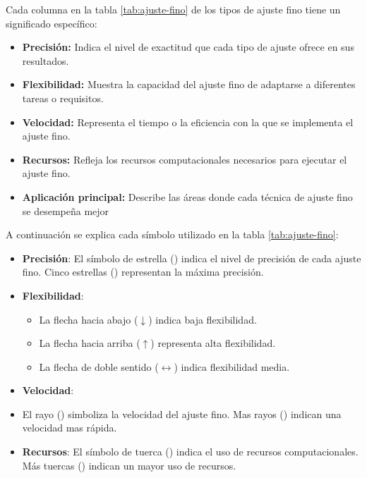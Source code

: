 Cada columna en la tabla \ref{tab:ajuste-fino} de los tipos de ajuste fino tiene un significado específico:

\begin{itemize}
	\item \textbf{Precisión: } Indica el nivel de exactitud que cada tipo de ajuste ofrece en sus resultados. 
	\item \textbf{Flexibilidad: } Muestra la capacidad del ajuste fino de adaptarse a diferentes tareas o requisitos.
	\item \textbf{Velocidad: }  Representa el tiempo o la eficiencia con la que se implementa el ajuste fino.
	\item \textbf{Recursos: } Refleja los recursos computacionales necesarios para ejecutar el ajuste fino.
	\item \textbf{Aplicación principal: } Describe las áreas donde cada técnica de ajuste fino se desempeña mejor
\end{itemize}

A continuación se explica cada símbolo utilizado en la tabla \ref{tab:ajuste-fino}:

\begin{itemize}
	\item \textbf{Precisión}: El símbolo de estrella (\starL) indica el nivel de precisión de cada ajuste fino. Cinco estrellas (\starL\starL\starL\starL\starL) representan la máxima precisión. 
	\item \textbf{Flexibilidad}:
	\begin{itemize}
		\item La flecha hacia abajo ($\downarrow$) indica baja flexibilidad.
		\item La flecha hacia arriba ($\uparrow$) representa alta flexibilidad.
		\item La flecha de doble sentido ($\leftrightarrow$) indica flexibilidad media.
	\end{itemize}
	\item \textbf{Velocidad}: \item El rayo (\rayo) simboliza la velocidad del ajuste fino. Mas rayos (\rayo\rayo\rayo\rayo\rayo) indican una velocidad mas rápida.
	\item \textbf{Recursos}: El símbolo de tuerca (\monitor) indica el uso de recursos computacionales. Más tuercas (\monitor\monitor\monitor\monitor) indican un mayor uso de recursos.
\end{itemize}



